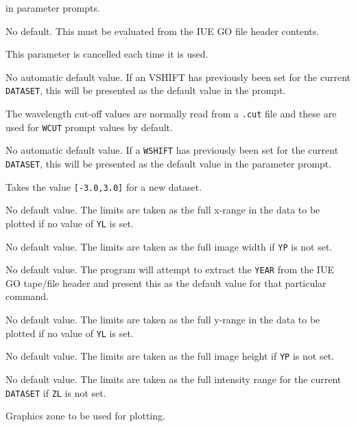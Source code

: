 \begin {description}
   in parameter prompts.
\item [\htmlref{TYPE}{TYPE}] \lmbox
   No default.  This must be evaluated from the IUE GO file header contents.
\item [\htmlref{V}{V} = H] \lmbox
   This parameter is cancelled each time it is used.
\item [\htmlref{VSHIFT}{VSHIFT}] \lmbox
   No automatic default value.  If an VSHIFT has previously been set for
   the current \verb+DATASET+, this will be presented as the default value in
   the prompt.
\item [\htmlref{WCUT}{WCUT}] \lmbox
   The wavelength cut-off values are normally read from a \verb+.cut+ file and
   these are used for \verb+WCUT+ prompt values by default.
\item [\htmlref{WSHIFT}{WSHIFT} = 0] \lmbox
   No automatic default value.  If a \verb+WSHIFT+ has previously been set for
   the current \verb+DATASET+, this will be presented as the default value in
   the parameter prompt.
\item [{\htmlref{XCUT}{XCUT} =[-3.0,3.0]}] \lmbox
   Takes the value \verb+[-3.0,3.0]+ for a new dataset.
\item [{\htmlref{XL}{XL} (=[0,0])}] \lmbox
   No default value.  The limits are taken as the full x-range in the data
   to be plotted if no value of \verb+YL+ is set.
\item [{\htmlref{XP}{XP} (=[0,0])}] \lmbox
   No default value.  The limits are taken as the full image width if \verb+YP+
   is not set.
\item [\htmlref{YEAR}{YEAR}] \lmbox
   No default value.  The program will attempt to extract the \verb+YEAR+ from
   the IUE GO tape/file header and present this as the default value for that
   particular command.
\item [{\htmlref{YL}{YL} (=[0,0])}] \lmbox
   No default value.  The limits are taken as the full y-range in the data
   to be plotted if no value of \verb+YL+ is set.
\item [{\htmlref{YP}{YP} (=[0,0])}] \lmbox
   No default value.  The limits are taken as the full image height if
   \verb+YP+ is not set.
\item [{\htmlref{ZL}{ZL} (=[0,0])}] \lmbox
   No default value.  The limits are taken as the full intensity range for the
   current \verb+DATASET+ if \verb+ZL+ is not set.
\item [\htmlref{ZONE}{ZONE} = 0] \lmbox
   Graphics zone to be used for plotting.

\end {description}

